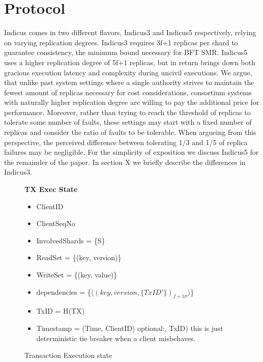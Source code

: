 %
%
%
%
%
%
%
%

\section{Protocol}
Indicus comes in two different flavors, Indicus3 and Indicus5 respectively, relying on varying replication degrees. Indicus3 requires 3f+1 replicas per shard to guarantee consistency, the minimum bound necessary for BFT SMR. Indicus5 uses a higher replication degree of 5f+1 replicas, but in return brings down both gracious execution latency and complexity during uncivil executions. We argue, that unlike past system settings where a single authority strives to maintain the fewest amount of replicas necessary for cost considerations, consortium systems with naturally higher replication degree are willing to pay the additional price for performance. Moreover, rather than trying to reach the threshold of replicas to tolerate some number of faults, these settings may start with a fixed number of replicas and consider the ratio of faults to be tolerable. When argueing from this perspective, the perceived difference between tolerating 1/3 and 1/5 of replica failures may be negligible.
For the simplicity of exposition we discuss Indicus5 for the remainder of the paper. In section X we briefly describe the differences in Indicus3.


\begin{figure}[t]
  \begin{mdframed}[roundcorner=10pt]
 	\textbf{TX Exec State}
 	\begin{itemize}
 	\item ClientID
 	\item ClientSeqNo
 	\item InvolvedShards = \{S\}
 	\item ReadSet = \{(key, version)\}
 	\item WriteSet = \{(key, value)\}
 	\item dependencies = \{$\langle (key, version, \{TxID'\})_{f+1 \sigma} \rangle$\}
 	\item TxID = H(TX)
 	\item Timestamp = (Time, ClientID)  optional:, TxID) this is just deterministic tie breaker when a client misbehaves.
 	\end{itemize}
  \end{mdframed}
  \caption{Transaction Execution state}
  \label{fig:TX}
\end{figure}

